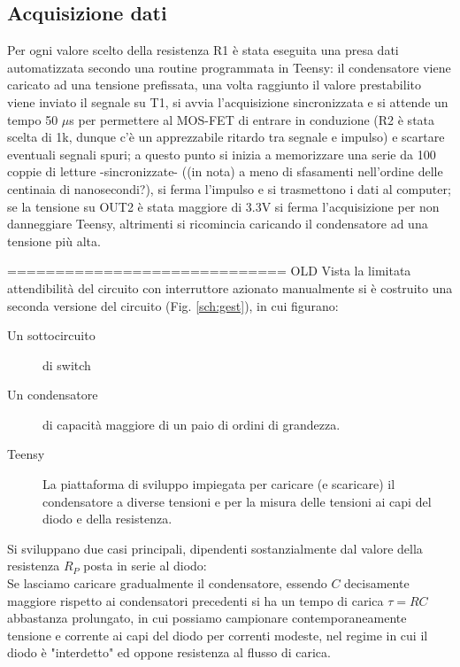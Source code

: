 \documentclass{article}[a4paper, oneside, 11pt]
\begin{document}
\subsection{Acquisizione dati}
Per ogni valore scelto della resistenza R1 è stata eseguita una presa dati automatizzata secondo una routine programmata in Teensy: il condensatore viene caricato ad una tensione prefissata, una volta raggiunto il valore prestabilito viene inviato il segnale su T1, si avvia l'acquisizione sincronizzata e si attende un tempo 50 $\mu$s per permettere al MOS-FET di entrare in conduzione (R2 è stata scelta di 1k, dunque c'è un apprezzabile ritardo tra segnale e impulso) e scartare eventuali segnali spuri; a questo punto si inizia a memorizzare una serie da 100 coppie di letture -sincronizzate- ((in nota) a meno di sfasamenti nell'ordine delle centinaia di nanosecondi?), si ferma l'impulso e si trasmettono i dati al computer; se la tensione su OUT2 è stata maggiore di 3.3V si ferma l'acquisizione per non danneggiare Teensy, altrimenti si ricomincia caricando il condensatore ad una tensione più alta.

============================= OLD\newline
Vista la limitata attendibilità del circuito con interruttore azionato
manualmente si è costruito una seconda versione del circuito (Fig.
\ref{sch:gest}), in cui figurano: 
\begin{description}
	\item [Un sottocircuito] di switch	
	\item [Un condensatore] di capacità maggiore di un paio di ordini di 
	grandezza.
	\item [Teensy] La piattaforma di sviluppo impiegata per caricare
	(e scaricare) il condensatore a diverse tensioni e per la misura delle
	tensioni ai capi del diodo e della resistenza.
\end{description}

Si sviluppano due casi principali, dipendenti sostanzialmente dal valore della
resistenza $R_P$ posta in serie al diodo:\\

Se lasciamo caricare gradualmente il condensatore, essendo $C$ decisamente
maggiore rispetto ai condensatori precedenti si ha un tempo di carica
$\tau = RC$ abbastanza prolungato, in cui possiamo campionare contemporaneamente
tensione e corrente ai capi del diodo per correnti modeste, nel regime in cui
il diodo è "interdetto" ed oppone resistenza al flusso di carica.
\end{document}

